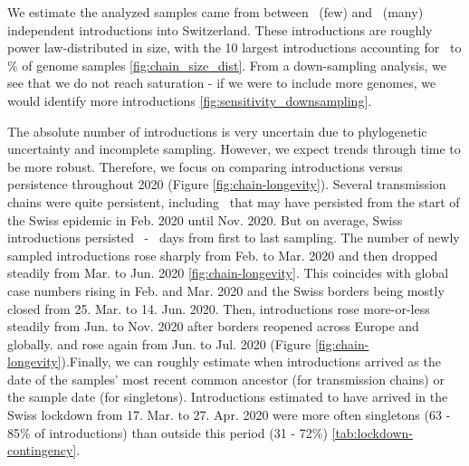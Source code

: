 \documentclass[9pt,twoside,lineno]{pnas-new} %
\begin{document}
We estimate the analyzed samples came from between \nchainsmin\ (few) and \nchainsmax\ (many) independent introductions into Switzerland. These introductions are roughly power law-distributed in size, with the 10 largest introductions accounting for \maxlargestchainsper\ to \minlargestchainsper \% of genome samples \ref{fig:chain_size_dist}. From a down-sampling analysis, we see that we do not reach saturation - if we were to include more genomes, we would identify more introductions \ref{fig:sensitivity_downsampling}. 


The absolute number of introductions is very uncertain due to phylogenetic uncertainty and incomplete sampling. However, we expect trends through time to be more robust. Therefore, we focus on comparing introductions versus persistence throughout 2020 (Figure \ref{fig:chain-longevity}). Several transmission chains were quite persistent, including \nspanningchainsfebnovmin\ that may have persisted from the start of the Swiss epidemic in Feb. 2020 until Nov. 2020. But on average, Swiss introductions persisted \meantimetolastsamplemax\ - \meantimetolastsamplemin\ days from first to last sampling. The number of newly sampled introductions rose sharply from Feb. to Mar. 2020 and then dropped steadily from Mar. to Jun. 2020 \ref{fig:chain-longevity}. This coincides with global case numbers rising in Feb. and Mar. 2020 and the Swiss borders being mostly closed from 25. Mar. to 14. Jun. 2020. Then, introductions rose more-or-less steadily from Jun. to Nov. 2020 after borders reopened across Europe and globally. and rose again from Jun. to Jul. 2020 (Figure \ref{fig:chain-longevity}).Finally, we can roughly estimate when introductions arrived as the date of the samples' most recent common ancestor (for transmission chains) or the sample date (for singletons). Introductions estimated to have arrived in the Swiss lockdown from 17. Mar. to 27. Apr. 2020 were more often singletons (63 - 85\% of introductions) than outside this period (31 - 72\%) \ref{tab:lockdown-contingency}.
\end{document}
